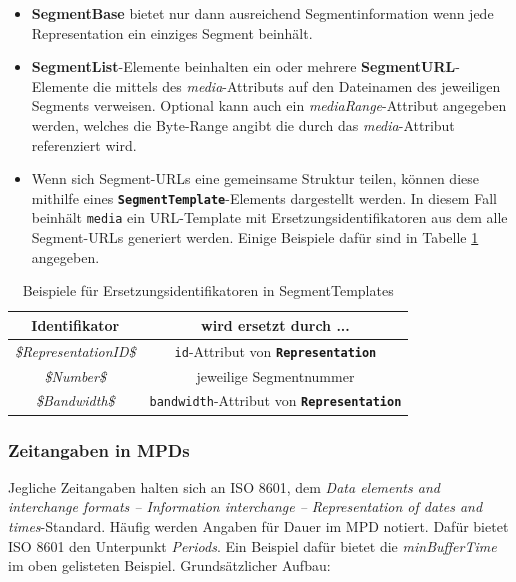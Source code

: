 \documentclass[paper = a4, fontsize = 12pt, parskip = half]{scrartcl} %
\def\attr#1{\texttt{#1}}
\def\elem#1{\texttt{\textbf{#1}}}
\begin{document}
\begin{itemize}
	\item \textbf{SegmentBase} bietet nur dann ausreichend Segmentinformation wenn jede Representation ein einziges Segment beinhält.
	\item \textbf{SegmentList}-Elemente beinhalten ein oder mehrere \textbf{SegmentURL}-Elemente die mittels des \textit{media}-Attributs auf den Dateinamen des jeweiligen Segments verweisen. Optional kann auch ein \textit{mediaRange}-Attribut angegeben werden, welches die Byte-Range angibt die durch das \textit{media}-Attribut referenziert wird.
	\item Wenn sich Segment-URLs eine gemeinsame Struktur teilen, können diese mithilfe eines \elem{SegmentTemplate}-Elements dargestellt werden. In diesem Fall beinhält \attr{media} ein URL-Template mit Ersetzungsidentifikatoren aus dem alle Segment-URLs generiert werden. Einige Beispiele dafür sind in Tabelle \ref{template_substitutions} angegeben. 
\end{itemize}

\begin{center}
	\begin{table}[ht]
        \centering
		\label{template_substitutions}
		\begin{tabular}{| c | c |}
			\hline
			\textbf{Identifikator}        & \textbf{wird ersetzt durch ...}                     \\
			\hline
			\hline
			\textit{\$RepresentationID\$} & \attr{id}-Attribut von \elem{Representation}        \\
			\hline
			\textit{\$Number\$}           & jeweilige Segmentnummer                             \\
			\hline
			\textit{\$Bandwidth\$}        & \attr{bandwidth}-Attribut von \elem{Representation} \\
			\hline
		\end{tabular}
        \caption{Beispiele für Ersetzungsidentifikatoren in SegmentTemplates}
	\end{table}
\end{center}


\subsubsection{Zeitangaben in MPDs}
\label{iso8601_duration}
Jegliche Zeitangaben halten sich an ISO 8601, dem \textit{Data elements and interchange formats – Information interchange – Representation of dates and times}-Standard. Häufig werden Angaben für Dauer im MPD notiert. Dafür bietet ISO 8601 den Unterpunkt \textit{Periods}. Ein Beispiel dafür bietet die \textit{minBufferTime} im oben gelisteten Beispiel. Grundsätzlicher Aufbau:
\end{document}
